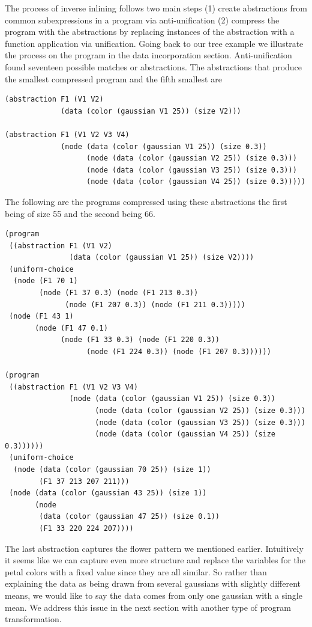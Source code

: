 \documentclass[a4paper,10pt]{article}
\begin{document}
The process of inverse inlining follows two main steps (1) create abstractions from common subexpressions in a program via anti-unification (2) compress the program with the abstractions by replacing instances of the abstraction with a function application via unification.  Going back to our tree example we illustrate the process on the program in the data incorporation section.
Anti-unification found seventeen possible matches or abstractions.  The abstractions that produce the smallest compressed program and the fifth smallest are 
\begin{lstlisting}
(abstraction F1 (V1 V2)
             (data (color (gaussian V1 25)) (size V2)))

(abstraction F1 (V1 V2 V3 V4)
             (node (data (color (gaussian V1 25)) (size 0.3))
                   (node (data (color (gaussian V2 25)) (size 0.3)))
                   (node (data (color (gaussian V3 25)) (size 0.3)))
                   (node (data (color (gaussian V4 25)) (size 0.3)))))
\end{lstlisting}
The following are the programs compressed using these abstractions the first being of size 55 and the second being 66.
\begin{lstlisting}
(program
 ((abstraction F1 (V1 V2)
               (data (color (gaussian V1 25)) (size V2))))
 (uniform-choice
  (node (F1 70 1)
        (node (F1 37 0.3) (node (F1 213 0.3))
              (node (F1 207 0.3)) (node (F1 211 0.3)))))
 (node (F1 43 1)
       (node (F1 47 0.1)
             (node (F1 33 0.3) (node (F1 220 0.3))
                   (node (F1 224 0.3)) (node (F1 207 0.3))))))

(program
 ((abstraction F1 (V1 V2 V3 V4)
               (node (data (color (gaussian V1 25)) (size 0.3))
                     (node (data (color (gaussian V2 25)) (size 0.3)))
                     (node (data (color (gaussian V3 25)) (size 0.3)))
                     (node (data (color (gaussian V4 25)) (size 0.3))))))
 (uniform-choice
  (node (data (color (gaussian 70 25)) (size 1))
        (F1 37 213 207 211)))
 (node (data (color (gaussian 43 25)) (size 1))
       (node
        (data (color (gaussian 47 25)) (size 0.1))
        (F1 33 220 224 207))))
\end{lstlisting}
The last abstraction captures the flower pattern we mentioned earlier.  Intuitively it seems like we can capture even more structure and replace the variables for the petal colors with a fixed value since they are all similar.  So rather than explaining the data as being drawn from several gaussians with slightly different means, we would like to say the data comes from only one gaussian with a single mean.  We address this issue in the next section with another type of program transformation.
\end{document}
